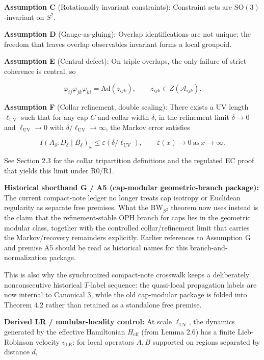 \textbf{Assumption C} (Rotationally invariant constraints): Constraint sets are \(\mathrm{SO}(3)\)-invariant on \(S^2\).

\textbf{Assumption D} (Gauge-as-gluing): Overlap identifications are not unique; the freedom that leaves overlap observables invariant forms a local groupoid.

\textbf{Assumption E} (Central defect): On triple overlaps, the only failure of strict coherence is central, so

\[
\varphi_{ij} \varphi_{jk} \varphi_{ki} = \mathrm{Ad}(z_{ijk}),\qquad z_{ijk} \in Z(\mathcal{A}_{ijk}).
\]

\textbf{Assumption F} (Collar refinement, double scaling): There exists a UV length \(\ell_{\mathrm{UV}}\) such that for any cap \(C\) and collar width \(\delta\), in the refinement limit \(\delta \to 0\) and \(\ell_{\mathrm{UV}} \to 0\) with \(\delta/\ell_{\mathrm{UV}} \to \infty\), the Markov error satisfies

\[
I(A_\delta:D_\delta \mid B_\delta)_\omega \le \varepsilon(\delta/\ell_{\mathrm{UV}}),
\qquad \varepsilon(x) \to 0 \ \text{as} \ x \to \infty.
\]

See Section 2.3 for the collar tripartition definitions and the regulated EC proof that yields this limit under R0/R1.

\textbf{Historical shorthand G / A5 (cap-modular geometric-branch package):} The current compact-note ledger no longer treats cap isotropy or Euclidean regularity as separate free premises. What the BW\(_{S^2}\) theorem now uses instead is the claim that the refinement-stable OPH branch for caps lies in the geometric modular class, together with the controlled collar/refinement limit that carries the Markov/recovery remainders explicitly. Earlier references to Assumption G and premise A5 should be read as historical names for this branch-and-normalization package.

This is also why the synchronized compact-note crosswalk keeps a deliberately nonconsecutive historical \(T\)-label sequence: the quasi-local propagation labels are now internal to Canonical 3, while the old cap-modular package is folded into Theorem 4.2 rather than retained as a standalone free premise.

\textbf{Derived LR / modular-locality control:} At scale \(\ell_{\mathrm{UV}}\), the dynamics generated by the effective Hamiltonian \(H_{\mathrm{eff}}\) (from Lemma 2.6) has a finite Lieb-Robinson velocity \(v_{\mathrm{LR}}\): for local operators \(A, B\) supported on regions separated by distance \(d\),

